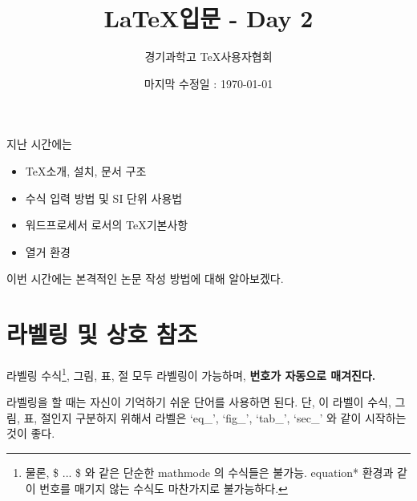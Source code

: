 \documentclass[12pt]{beamer}
\title[\LaTeX - Day 2]{\LaTeX 입문 - Day 2}
\author{경기과학고 \TeX 사용자협회}
\institute[GSHSTeXSociety]{\url{latex.gs.hs.kr}}
\date{마지막 수정일 : \today}
\begin{document}
\begin{frame}
\titlepage %
\end{frame}

\begin{frame}{지난 시간에는}
	\begin{itemize}
		\item \TeX 소개, 설치, 문서 구조
		\item 수식 입력 방법 및 SI 단위 사용법
		\item 워드프로세서 로서의 \TeX 기본사항
		\item 열거 환경
	\end{itemize}
	이번 시간에는 본격적인 논문 작성 방법에 대해 알아보겠다.
\end{frame}

\section{라벨링 및 상호 참조}
\begin{frame}{라벨링}
	수식\footnote{물론, \$ ... \$ 와 같은 단순한 mathmode 의 수식들은 불가능. equation* 환경과 같이 번호를 매기지 않는 수식도 마찬가지로 불가능하다.}, 그림, 표, 절 모두 라벨링이 가능하며, \textbf{번호가 자동으로 매겨진다.}
	
	라벨링을 할 때는 자신이 기억하기 쉬운 단어를 사용하면 된다. 단, 이 라벨이 수식, 그림, 표, 절인지 구분하지 위해서 라벨은 `eq\_', `fig\_', `tab\_', `sec\_' 와 같이 시작하는 것이 좋다.

	
\end{frame}
\end{document}
